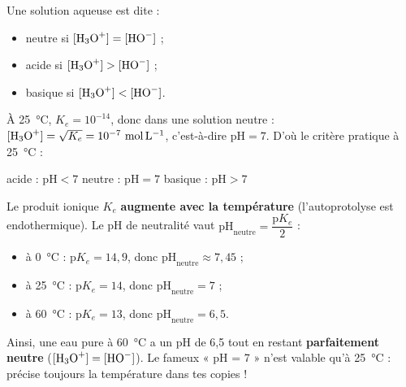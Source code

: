 \documentclass[11pt]{article}
\newcommand{\cle}[1]{{\popxbold\color{popdark}#1}}
\begin{document}
\begin{definition}
Une solution aqueuse est dite :
\begin{itemize}
\item \cle{neutre} si $[\ce{H3O+}] = [\ce{HO-}]$ ;
\item \cle{acide} si $[\ce{H3O+}] > [\ce{HO-}]$ ;
\item \cle{basique} si $[\ce{H3O+}] < [\ce{HO-}]$.
\end{itemize}
À \SI{25}{\celsius}, $K_e = 10^{-14}$, donc dans une solution neutre : $[\ce{H3O+}] = \sqrt{K_e} = 10^{-7}\ \si{mol.L^{-1}}$, c'est-à-dire $\mathrm{pH} = 7$. D'où le critère pratique à \SI{25}{\celsius} :
\begin{center}
acide : $\mathrm{pH} < 7$ \qquad neutre : $\mathrm{pH} = 7$ \qquad basique : $\mathrm{pH} > 7$
\end{center}
\end{definition}

\begin{attention}
Le produit ionique $K_e$ \textbf{augmente avec la température} (l'autoprotolyse est endothermique). Le pH de neutralité vaut $\mathrm{pH}_{\text{neutre}} = \dfrac{\mathrm{p}K_e}{2}$ :
\begin{itemize}
\item à \SI{0}{\celsius} : $\mathrm{p}K_e = 14{,}9$, donc $\mathrm{pH}_{\text{neutre}} \approx 7{,}45$ ;
\item à \SI{25}{\celsius} : $\mathrm{p}K_e = 14$, donc $\mathrm{pH}_{\text{neutre}} = 7$ ;
\item à \SI{60}{\celsius} : $\mathrm{p}K_e = 13$, donc $\mathrm{pH}_{\text{neutre}} = 6{,}5$.
\end{itemize}
Ainsi, une eau pure à \SI{60}{\celsius} a un pH de 6,5 tout en restant \textbf{parfaitement neutre} ($[\ce{H3O+}] = [\ce{HO-}]$). Le fameux « pH = 7 » n'est valable qu'à \SI{25}{\celsius} : précise toujours la température dans tes copies !
\end{attention}
\end{document}

